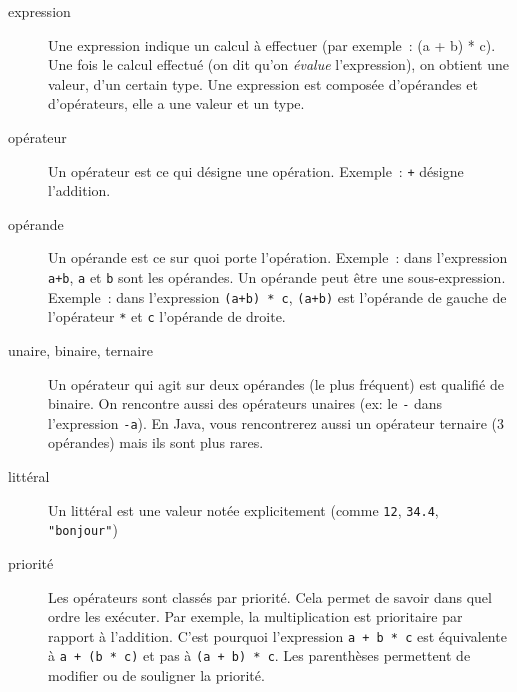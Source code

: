 			\begin{description}
			\item[expression]
				Une expression indique un calcul à effectuer
				(par exemple~: (a + b) * c).
				Une fois le calcul effectué
				(on dit qu’on \emph{évalue} l’expression), 
				on obtient une valeur, d’un certain type.
				Une expression est composée d’opérandes et d’opérateurs,
				elle a une valeur et un type.
			\item[opérateur]
				Un opérateur est ce qui désigne une opération.
				Exemple~: \Verb_+_ désigne l’addition.
			\item[opérande]
				Un opérande est ce sur quoi porte l’opération.
				Exemple~: dans l’expression \Verb_a+b_, 
				\Verb_a_ et \Verb_b_ sont les opérandes.
				Un opérande peut être une sous-expression.
				Exemple~: dans l’expression \Verb_(a+b) * c_, 
				\Verb_(a+b)_ est l’opérande 
				de gauche de l’opérateur \Verb_*_ et \Verb_c_ l'opérande de 
				droite.
			\item[unaire, binaire, ternaire]
				Un opérateur qui agit sur deux opérandes (le plus fréquent)
				est qualifié de binaire. 
				On rencontre aussi des opérateurs unaires (ex: le \Verb_-_ 
				dans l’expression \Verb_-a_).
				En Java, vous rencontrerez aussi un opérateur ternaire (3 opérandes)
				mais ils sont plus rares.
			\item[littéral]
				Un littéral est une valeur notée explicitement 
				(comme \Verb_12_, \Verb_34.4_, \Verb_"bonjour"_)
			\item[priorité]

				Les opérateurs sont classés par priorité.  Cela permet de savoir
				dans quel ordre les exécuter.  Par exemple, la multiplication
				est prioritaire par rapport à l'addition.  C’est pourquoi
				l'expression \Verb_a + b * c_ est équivalente à 
				\Verb_a + (b * c)_ et pas à \Verb_(a + b) * c_.  
				Les parenthèses permettent
				de modifier ou de souligner la priorité.  
		
		\end{description}
			
